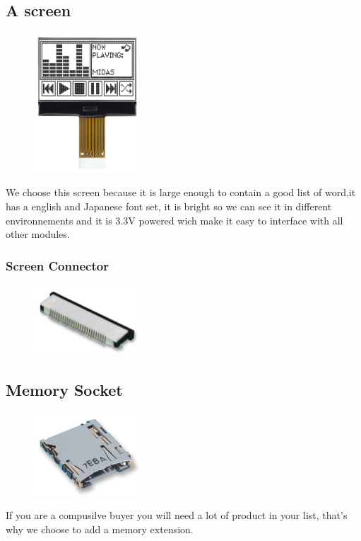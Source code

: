 \documentclass[12pt,a4paper,landscape]{article}
\begin{document}
\begin{multicols}{2}
	\subsection*{A screen}
			\begin{figure}[H]
			\centering
			\includegraphics[width=4cm]{images/screen.png}
			\end{figure}
			We choose this screen because it is large enough to contain a good list of word,it has a english and Japanese font set, it is bright so we can see it in different environnements and it is 3.3V powered wich make it easy to interface with all other modules.

	\subsubsection*{Screen Connector}
			\begin{figure}[H]
			\centering
			\includegraphics[width=4cm]{images/screen_connector.png}
			\end{figure}

	\subsection*{Memory Socket}
			\begin{figure}[H]
			\centering
			\includegraphics[width=4cm]{images/memory_socket.png}
			\end{figure}
			If you are a compusilve buyer you will need a lot of product in your list, that's why we choose to add a memory extension.


\end{multicols}
\end{document}
